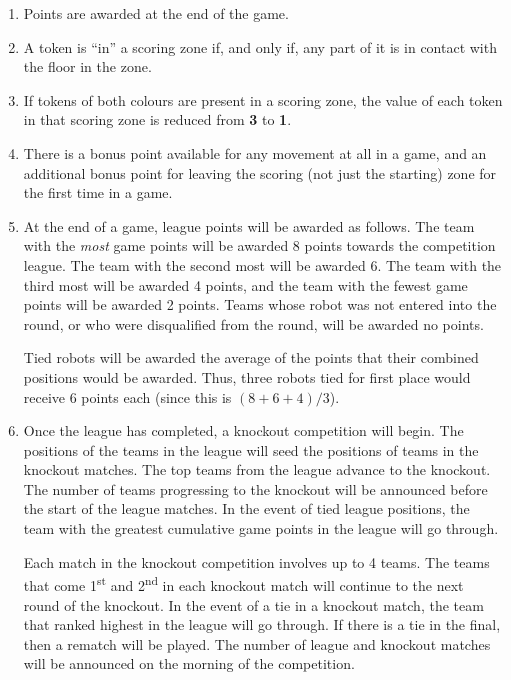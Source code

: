 \begin{enumerate}
\item Points are awarded at the end of the game.

\item A token is ``in'' a scoring zone if, and only if, any part of it is in contact with the floor in the zone.

\item If tokens of both colours are present in a scoring zone, the value of each token in that scoring zone is reduced from \textbf{3} to \textbf{1}.

\item There is a bonus point available for any movement at all in a game, and an additional bonus point for leaving the scoring (not just the starting) zone for the first time in a game.

\item At the end of a game, league points will be awarded as follows.
      The team with the \emph{most} game points will be awarded 8 points towards the competition league.
      The team with the second most will be awarded 6.
      The team with the third most will be awarded 4 points, and the team with the fewest game points will be awarded 2 points.
      Teams whose robot was not entered into the round, or who were disqualified from the round, will be awarded no points.

      Tied robots will be awarded the average of the points that their combined positions would be awarded.
      Thus, three robots tied for first place would receive 6 points each (since this is $(8+6+4)/3$).

\item Once the league has completed, a knockout competition will begin.
      The positions of the teams in the league will seed the positions of teams in the knockout matches.
      The top teams from the league advance to the knockout.
      The number of teams progressing to the knockout will be announced before the start of the league matches.
      In the event of tied league positions, the team with the greatest cumulative game points in the league will go through.

      Each match in the knockout competition involves up to 4 teams.
      The teams that come 1\textsuperscript{st} and 2\textsuperscript{nd} in each knockout match will continue to the next round of the knockout.
      In the event of a tie in a knockout match, the team that ranked highest in the league will go through.
      If there is a tie in the final, then a rematch will be played.
      The number of league and knockout matches will be announced on the morning of the competition.

\end{enumerate}

